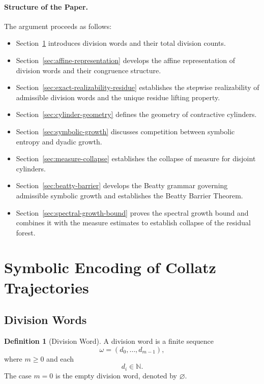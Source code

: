 \documentclass[12pt, oneside]{article}
\numberwithin{equation}{section}
\theoremstyle{definition}
\newtheorem{definition}{Definition}[section]
\theoremstyle{plain}
\theoremstyle{remark}
\begin{document}
\paragraph{Structure of the Paper.}
The argument proceeds as follows:
\begin{itemize}
\item Section~\ref{sec:division-counts} introduces division words and their total division counts.
\item Section~\ref{sec:affine-representation} develops the affine representation of division words and their congruence structure.
\item Section~\ref{sec:exact-realizability-residue} establishes the stepwise realizability of admissible division words and the unique residue lifting property.
\item Section~\ref{sec:cylinder-geometry} defines the geometry of contractive cylinders.
\item Section~\ref{sec:symbolic-growth} discusses competition between symbolic entropy and dyadic growth.
\item Section~\ref{sec:measure-collapse} establishes the collapse of measure for disjoint cylinders.
\item Section~\ref{sec:beatty-barrier} develops the Beatty grammar governing admissible symbolic growth and establishes the Beatty Barrier Theorem.
\item Section~\ref{sec:spectral-growth-bound} proves the spectral growth bound and combines it with the measure estimates to establish collapse of the residual forest.
\end{itemize}


\section{Symbolic Encoding of Collatz Trajectories}
\label{sec:division-counts}

\subsection{Division Words}

\begin{definition}[Division Word]
A division word is a finite sequence
\[
\omega=(d_0,\dots,d_{m-1}),
\]
where \(m\ge 0\) and each
\[
d_i\in\mathbb{N}.
\]
The case \(m=0\) is the empty division word, denoted by \(\varnothing\).
\end{definition}
\end{document}
